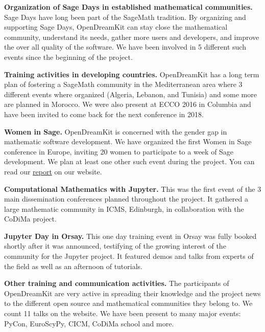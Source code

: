 \documentclass{deliverablereport}
\begin{document}
\begin{compactitem}
\item \textbf{Organization of Sage Days in established mathematical communities.} Sage Days have long been
part of the SageMath tradition. By organizing and supporting Sage Days, OpenDreamKit can stay close
the mathematical community, understand its needs, gather more users and developers, and improve
the over all quality of the software. We have been involved in 5 different such events since the beginning 
of the project.
\item \textbf{Training activities in developing countries.} OpenDreamKit has a long term plan of fostering
a SageMath community in the Mediterranean area where 3 different events where organized (Algeria, Lebanon, and Tunisia) 
and some more are planned in Morocco. We were also present at ECCO 2016 in Columbia and have been invited
to come back for the next conference in 2018. 
\item \textbf{Women in Sage.} OpenDreamKit is concerned with the gender gap in mathematic software development. 
We have organized the first Women in Sage conference in Europe, inviting 20 women to participate to a week of Sage development. We plan at least one other such event during the project. You can read our \href{http://opendreamkit.org/2017/04/06/WomenInSage/}{report} on our website.
\item \textbf{Computational Mathematics with Jupyter.} This was the first event of the 3 main dissemination conferences
planned throughout the project. It gathered a large mathematic community in ICMS, Edinburgh, in collaboration with the CoDiMa project.
\item \textbf{Jupyter Day in Orsay.} This one day training event in Orsay was fully booked shortly after it was announced, testifying of the growing interest of the community for the Jupyter project. It featured demos and talks from experts of the field as well as an afternoon of tutorials. 
\item \textbf{Other training and communication activities.} The participants of OpenDreamKit are very active
in spreading their knowledge and the project news to the different open source and mathematical communities they belong to. We count 11 talks on the website. We have been present to many major events: PyCon, EuroScyPy, CICM, CoDiMa school and more. 
\end{compactitem}

\paragraph{}
\end{document}
